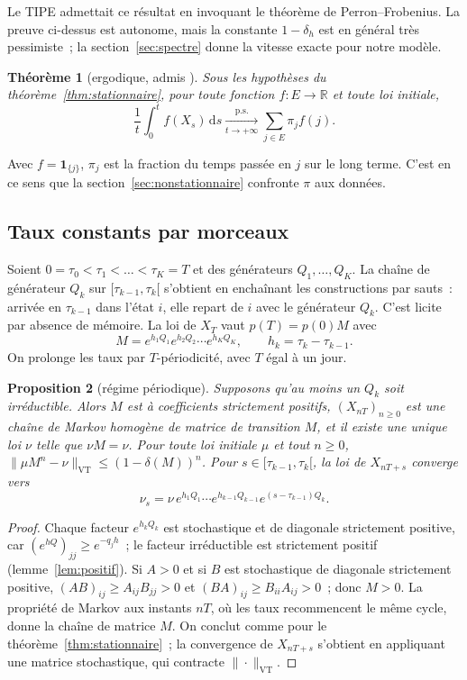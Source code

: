 \documentclass[10pt,a4paper,twocolumn]{article}
\theoremstyle{enonce}
\newtheorem{theoreme}{Théorème}[section]
\newtheorem{proposition}[theoreme]{Proposition}
\theoremstyle{defi}
\newcommand{\VT}{\mathrm{VT}}
\newcommand{\dd}{\mathrm{d}}
\newcommand{\un}{\mathbf{1}}
\begin{document}
Le TIPE admettait ce résultat en invoquant le théorème de Perron--Frobenius. La preuve ci-dessus est autonome, mais la constante $1-\delta_h$ est en général très pessimiste~; la section~\ref{sec:spectre} donne la vitesse exacte pour notre modèle.

\begin{theoreme}[ergodique, admis {\cite[§3.8]{Nor97}}]\label{thm:ergodique}
Sous les hypothèses du théorème~\ref{thm:stationnaire}, pour toute fonction $f:E\to\mathbb{R}$ et toute loi initiale,
\[
\frac1t\int_0^tf(X_s)\,\dd s\xrightarrow[t\to+\infty]{\text{p.s.}}\sum_{j\in E}\pi_jf(j).
\]
\end{theoreme}

Avec $f=\un_{\{j\}}$, $\pi_j$ est la fraction du temps passée en $j$ sur le long terme. C'est en ce sens que la section~\ref{sec:nonstationnaire} confronte $\pi$ aux données.

\subsection{Taux constants par morceaux}\label{sec:periodique}

Soient $0=\tau_0<\tau_1<\dots<\tau_K=T$ et des générateurs $Q_1,\dots,Q_K$. La chaîne de générateur $Q_k$ sur $[\tau_{k-1},\tau_k[$ s'obtient en enchaînant les constructions par sauts~: arrivée en $\tau_{k-1}$ dans l'état $i$, elle repart de $i$ avec le générateur $Q_k$. C'est licite par absence de mémoire. La loi de $X_T$ vaut $p(T)=p(0)M$ avec
\[
M=e^{h_1Q_1}e^{h_2Q_2}\cdots e^{h_KQ_K},\qquad h_k=\tau_k-\tau_{k-1}.
\]
On prolonge les taux par $T$-périodicité, avec $T$ égal à un jour.

\begin{proposition}[régime périodique]\label{prop:periodique}
Supposons qu'au moins un $Q_k$ soit irréductible. Alors $M$ est à coefficients strictement positifs, $(X_{nT})_{n\geq0}$ est une chaîne de Markov homogène de matrice de transition $M$, et il existe une unique loi $\nu$ telle que $\nu M=\nu$. Pour toute loi initiale $\mu$ et tout $n\geq0$, $\|\mu M^n-\nu\|_\VT\leq(1-\delta(M))^n$. Pour $s\in[\tau_{k-1},\tau_k[$, la loi de $X_{nT+s}$ converge vers
\[
\nu_s=\nu\,e^{h_1Q_1}\cdots e^{h_{k-1}Q_{k-1}}e^{(s-\tau_{k-1})Q_k}.
\]
\end{proposition}

\begin{proof}
Chaque facteur $e^{h_kQ_k}$ est stochastique et de diagonale strictement positive, car $(e^{hQ})_{jj}\geq e^{-q_jh}$~; le facteur irréductible est strictement positif (lemme~\ref{lem:positif}). Si $A>0$ et si $B$ est stochastique de diagonale strictement positive, $(AB)_{ij}\geq A_{ij}B_{jj}>0$ et $(BA)_{ij}\geq B_{ii}A_{ij}>0$~; donc $M>0$. La propriété de Markov aux instants $nT$, où les taux recommencent le même cycle, donne la chaîne de matrice $M$. On conclut comme pour le théorème~\ref{thm:stationnaire}~; la convergence de $X_{nT+s}$ s'obtient en appliquant une matrice stochastique, qui contracte $\|\cdot\|_\VT$.
\end{proof}
\end{document}
